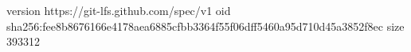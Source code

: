version https://git-lfs.github.com/spec/v1
oid sha256:fee8b8676166e4178aea6885cfbb3364f55f06dff5460a95d710d45a3852f8ec
size 393312
